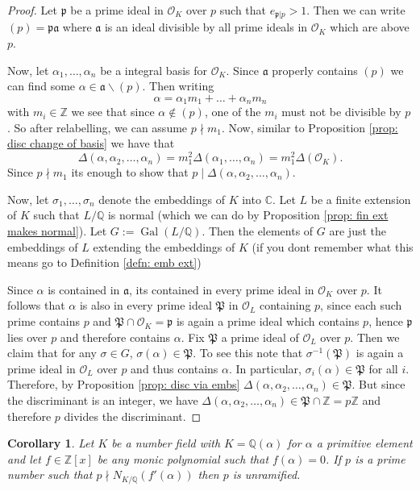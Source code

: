\documentclass[11pt,a4paper]{report}
\theoremstyle{plain}
\newtheorem{cor}[subsection]{Corollary}
\theoremstyle{definition}
\theoremstyle{definition}
\newcommand{\ZZ}{\mathbb{Z}}
\def\CC{\mathbb{C}}
\def\QQ{\mathbb{Q}}
\def \gothP{\mathfrak{P}}
\def\gothp{\mathfrak{p}}
\def \a{\alpha}
\def \s {\sigma}
\def \OO {\mathcal{O}}
\def \s {\sigma}
\def\gotha{\mathfrak{a}}
\DeclareMathOperator{\Gal}{Gal}
\begin{document}
	\begin{proof}
		Let $\gothp$ be a prime ideal in $\OO_K$ over $p$ such that $e_{\gothp|p}>1$. Then we can write $(p)=\gothp \gotha$ where $\gotha$ is an ideal divisible by all prime ideals in $\OO_K$ which are above $p$. 
		
		Now, let $\a_1,\dots,\a_n$ be  a integral basis for $\OO_K$. Since $\gotha$ properly contains $(p)$ we can find some $\a \in \gotha \backslash (p)$. Then writing \[\a=\a_1m_1+\dots+\a_nm_n\] with $m_i \in \ZZ$ we see that since $\a \not \in (p)$, one of the $m_i$ must not be divisible by $p$. So after relabelling, we can assume $p \nmid m_1$. Now, similar to Proposition \ref{prop: disc change of basis} we have that \[\Delta(\a,\a_2,\dots,\a_n)=m_1^2 \Delta(\a_1,\dots,\a_n)=m_1^2\Delta(\OO_K).\] Since $p \nmid m_1$ its enough to show that $p \mid \Delta(\a,\a_2,\dots,\a_n)$.
		
		Now, let $\s_1,\dots,\s_n$ denote the embeddings of $K$ into $\CC$. Let $L$ be a finite extension of $K$ such that $L/\QQ$ is normal (which we can do by Proposition \ref{prop: fin ext makes normal}). Let $G:=\Gal(L/\QQ)$. Then the elements of $G$ are just the embeddings of $L$ extending the embeddings of $K$ (if you dont remember what this means go to Definition \ref{defn: emb ext})
		
		Since $\a$ is contained in $\gotha$, its contained in every prime ideal in $\OO_K$ over $p$. It follows that $\a$ is also in every prime ideal $\gothP$ in $\OO_L$ containing $p$, since each such prime contains $p$ and $\gothP \cap \OO_K=\gothp$ is again a prime ideal which contains $p$, hence $\gothp$ lies over $p$ and therefore contains $\a$. Fix $\gothP$ a prime ideal of $\OO_L$ over $p$. Then we claim that for any $\s \in G$, $\s(\a) \in \gothP$. To see this note that $\s^{-1}(\gothP)$ is again a prime ideal in $\OO_L$ over $p$ and thus contains $\a$. In particular, $\s_i(\a) \in \gothP$ for all $i$. Therefore, by Proposition \ref{prop: disc via embs} $\Delta(\a,\a_2,\dots,\a_n) \in \gothP$. But since the discriminant is an integer, we have $\Delta(\a,\a_2,\dots,\a_n) \in \gothP \cap \ZZ=p\ZZ$ and therefore $p$ divides the discriminant.
		
	\end{proof}
	
	\begin{cor}\label{cor: p unram if norm of blah}
		Let $K$ be a number field with $K=\QQ(\a)$ for $\a$ a primitive element and let $f \in \ZZ[x]$ be any monic polynomial such that $f(\a)=0$. If $p$ is a prime number such that $p \nmid N_{K/\QQ}(f'(\a))$ then $p$ is unramified.
	\end{cor}
	
\end{document}
